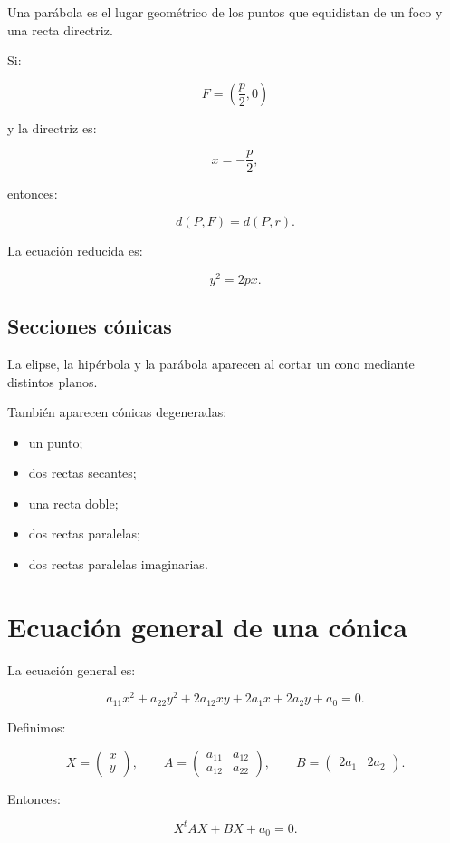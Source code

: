 \documentclass[11pt,a4paper]{article}
\begin{document}
Una parábola es el lugar geométrico de los puntos que equidistan de un foco y una recta directriz.

Si:

\[
F=\left(\frac p2,0\right)
\]

y la directriz es:

\[
x=-\frac p2,
\]

entonces:

\[
d(P,F)=d(P,r).
\]

La ecuación reducida es:

\[
\boxed{
y^2=2px.
}
\]

\subsection{Secciones cónicas}

La elipse, la hipérbola y la parábola aparecen al cortar un cono mediante distintos planos.

También aparecen cónicas degeneradas:

\begin{itemize}
\item un punto;
\item dos rectas secantes;
\item una recta doble;
\item dos rectas paralelas;
\item dos rectas paralelas imaginarias.
\end{itemize}

\section{Ecuación general de una cónica}

La ecuación general es:

\[
\boxed{
a_{11}x^2+a_{22}y^2+2a_{12}xy+2a_1x+2a_2y+a_0=0.
}
\]

Definimos:

\[
X=
\begin{pmatrix}
x\\y
\end{pmatrix},
\qquad
A=
\begin{pmatrix}
a_{11}&a_{12}\\
a_{12}&a_{22}
\end{pmatrix},
\qquad
B=
\begin{pmatrix}
2a_1&2a_2
\end{pmatrix}.
\]

Entonces:

\[
\boxed{
X^tAX+BX+a_0=0.
}
\]
\end{document}

